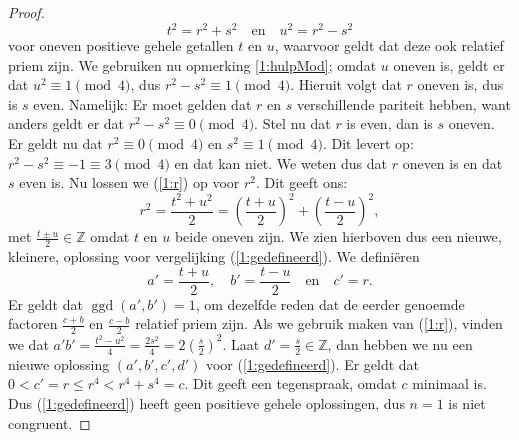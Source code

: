 \documentclass[12pt,reqno]{article}
\newcommand*{\ZZ}{\ensuremath{\mathbb{Z}}}
\theoremstyle{theorem}
\theoremstyle{definition}
\DeclareMathOperator{\ggd}{ggd}
\begin{document}
\begin{proof}
		\begin{equation}\label{1:r}
			t^2 = r^2 + s^2 \quad \text{en} \quad u^2 = r^2 - s^2
		\end{equation}
		voor oneven positieve gehele getallen $t$ en $u$, waarvoor geldt dat deze ook relatief priem zijn. We gebruiken nu opmerking \ref{1:hulpMod}; omdat $u$ oneven is, geldt er dat $u^2 \equiv 1 \pmod{4}$, dus $r^2 - s^2 \equiv 1 \pmod{4}$. Hieruit volgt dat $r$ oneven is, dus is $s$ even. Namelijk: Er moet gelden dat $r$ en $s$ verschillende pariteit hebben, want anders geldt er dat $r^2 - s^2 \equiv 0 \pmod{4}$. Stel nu dat $r$ is even, dan is $s$ oneven. Er geldt nu dat $r^2 \equiv 0 \pmod{4}$ en $s^2 \equiv 1 \pmod{4}$. Dit levert op: $r^2 - s^2 \equiv -1 \equiv 3 \pmod{4}$ en dat kan niet. We weten dus dat $r$ oneven is en dat $s$ even is. Nu lossen we  (\ref{1:r}) op voor $r^2$. Dit geeft ons:
		\begin{equation*}
			r^2 = \frac{t^2 + u^2}{2} = \left( \frac{t+u}{2} \right)^2 + \left( \frac{t-u}{2} \right)^2,
		\end{equation*}
		met $\frac{t \pm u}{2} \in\ZZ$ omdat $t$ en $u$ beide oneven zijn. We zien hierboven dus een nieuwe, kleinere, oplossing voor vergelijking (\ref{1:gedefineerd}). We defini\"eren
		\begin{equation*}
			a' = \frac{t+u}{2}, \quad b' = \frac{t-u}{2} \quad \text{en} \quad c' = r.
		\end{equation*}
		Er geldt dat $\ggd(a',b') = 1$, om dezelfde reden dat de eerder genoemde factoren $\frac{c+b}{2}$ en $\frac{c-b}{2}$ relatief priem zijn. Als we gebruik maken van (\ref{1:r}), vinden we dat $a'b' = \frac{t^2 - u^2}{4} = \frac{2s^2}{4} = 2\left( \frac{s}{2} \right)^2$. Laat $d' = \frac{s}{2} \in\ZZ$, dan hebben we nu een nieuwe oplossing $(a', b', c', d')$ voor (\ref{1:gedefineerd}). Er geldt dat $0 < c'= r \leq r^4 < r^4 + s^4 = c$. Dit geeft een tegenspraak, omdat $c$ minimaal is. Dus (\ref{1:gedefineerd}) heeft geen positieve gehele oplossingen, dus $n=1$ is niet congruent.
	\end{proof}
\end{document}
